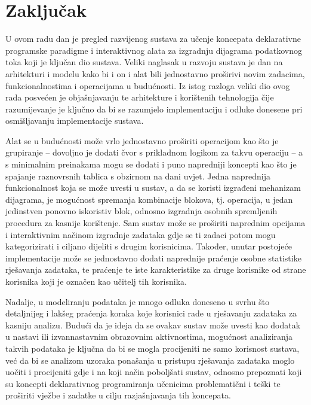 \documentclass[times, utf8, diplomski, numeric]{fer}
\begin{document}
\chapter{Zaključak}

U ovom radu dan je pregled razvijenog sustava za učenje koncepata deklarativne programske paradigme i interaktivnog alata za izgradnju dijagrama podatkovnog toka koji je ključan dio sustava.
Veliki naglasak u razvoju sustava je dan na arhitekturi i modelu kako bi i on i alat bili jednostavno proširivi novim zadacima, funkcionalnostima i operacijama u budućnosti.
Iz istog razloga veliki dio ovog rada posvećen je objašnjavanju te arhitekture i korištenih tehnologija čije razumijevanje je ključno da bi se razumjelo implementaciju i odluke donesene pri osmišljavanju implementacije sustava.

Alat se u budućnosti može vrlo jednostavno proširiti operacijom kao što je grupiranje -- dovoljno je dodati čvor s prikladnom logikom za takvu operaciju -- a s minimalnim preinakama mogu se dodati i puno napredniji koncepti kao što je spajanje raznovrsnih tablica s obzirnom na dani uvjet.
Jedna naprednija funkcionalnost koja se može uvesti u sustav, a da se koristi izgrađeni mehanizam dijagrama, je mogućnost spremanja kombinacije blokova, tj. operacija, u jedan jedinstven ponovno iskoristiv blok, odnosno izgradnja osobnih spremljenih procedura za kasnije korištenje.
Sam sustav može se proširiti naprednim opcijama i interaktivnim načinom izgradnje zadataka gdje se ti zadaci potom mogu kategorizirati i ciljano dijeliti s drugim korisnicima.
Također, unutar postojeće implementacije može se jednostavno dodati naprednije praćenje osobne statistike rješavanja zadataka, te praćenje te iste karakteristike za druge korisnike od strane korisnika koji je označen kao učitelj tih korisnika.

Nadalje, u modeliranju podataka je mnogo odluka doneseno u svrhu što detaljnijeg i lakšeg praćenja koraka koje korisnici rade u rješavanju zadataka za kasniju analizu.
Budući da je ideja da se ovakav sustav može uvesti kao dodatak u nastavi ili izvannastavnim obrazovnim aktivnostima, mogućnost analiziranja takvih podataka je ključna da bi se mogla procijeniti ne samo korisnost sustava, već da bi se analizom uzoraka ponašanja u pristupu rješavanja zadataka moglo uočiti i procijeniti gdje i na koji način poboljšati sustav, odnosno prepoznati koji su koncepti deklarativnog programiranja učenicima problematični i teški te proširiti vježbe i zadatke u cilju razjašnjavanja tih koncepata.
\end{document}
